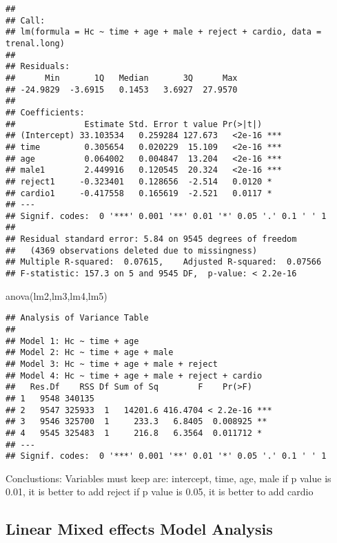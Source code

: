 \documentclass[
]{article}
\newenvironment{Shaded}{\begin{snugshade}}{\end{snugshade}}
\newcommand{\FunctionTok}[1]{\textcolor[rgb]{0.00,0.00,0.00}{#1}}
\newcommand{\NormalTok}[1]{#1}
\begin{document}
\begin{verbatim}
## 
## Call:
## lm(formula = Hc ~ time + age + male + reject + cardio, data = trenal.long)
## 
## Residuals:
##      Min       1Q   Median       3Q      Max 
## -24.9829  -3.6915   0.1453   3.6927  27.9570 
## 
## Coefficients:
##              Estimate Std. Error t value Pr(>|t|)    
## (Intercept) 33.103534   0.259284 127.673   <2e-16 ***
## time         0.305654   0.020229  15.109   <2e-16 ***
## age          0.064002   0.004847  13.204   <2e-16 ***
## male1        2.449916   0.120545  20.324   <2e-16 ***
## reject1     -0.323401   0.128656  -2.514   0.0120 *  
## cardio1     -0.417558   0.165619  -2.521   0.0117 *  
## ---
## Signif. codes:  0 '***' 0.001 '**' 0.01 '*' 0.05 '.' 0.1 ' ' 1
## 
## Residual standard error: 5.84 on 9545 degrees of freedom
##   (4369 observations deleted due to missingness)
## Multiple R-squared:  0.07615,    Adjusted R-squared:  0.07566 
## F-statistic: 157.3 on 5 and 9545 DF,  p-value: < 2.2e-16
\end{verbatim}

\begin{Shaded}
\begin{Highlighting}[]
\FunctionTok{anova}\NormalTok{(lm2,lm3,lm4,lm5)}
\end{Highlighting}
\end{Shaded}

\begin{verbatim}
## Analysis of Variance Table
## 
## Model 1: Hc ~ time + age
## Model 2: Hc ~ time + age + male
## Model 3: Hc ~ time + age + male + reject
## Model 4: Hc ~ time + age + male + reject + cardio
##   Res.Df    RSS Df Sum of Sq        F    Pr(>F)    
## 1   9548 340135                                    
## 2   9547 325933  1   14201.6 416.4704 < 2.2e-16 ***
## 3   9546 325700  1     233.3   6.8405  0.008925 ** 
## 4   9545 325483  1     216.8   6.3564  0.011712 *  
## ---
## Signif. codes:  0 '***' 0.001 '**' 0.01 '*' 0.05 '.' 0.1 ' ' 1
\end{verbatim}

Conclustions: Variables must keep are: intercept, time, age, male if p
value is 0.01, it is better to add reject if p value is 0.05, it is
better to add cardio

\hypertarget{linear-mixed-effects-model-analysis}{%
\subsection{Linear Mixed effects Model
Analysis}\label{linear-mixed-effects-model-analysis}}
\end{document}
